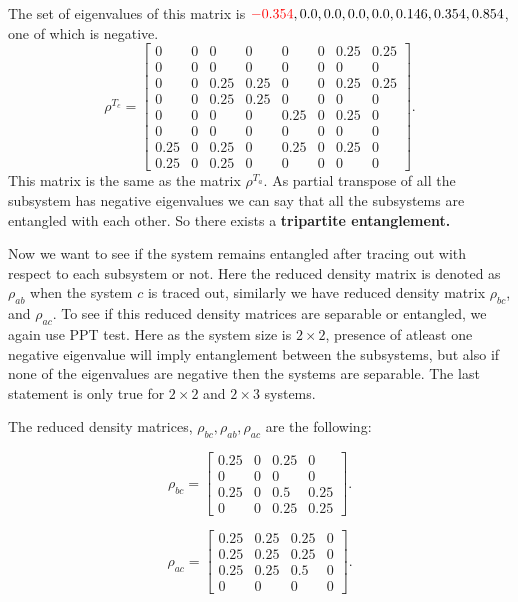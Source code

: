 \documentclass{amsart}
\theoremstyle{plain}
\theoremstyle{definition}
\theoremstyle{plain}
\begin{document}
 	The set of eigenvalues of this matrix is $\textcolor{red}{-0.354}, 0.0, 0.0, 0.0, 0.0, 0.146, 0.354, 0.854$, one of which is negative. 
 	\begin{equation*}
 		\rho^{T_c} = \left[\begin{matrix}0 & 0 & 0 & 0 & 0 & 0 & 0.25 & 0.25\\0 & 0 & 0 & 0 & 0 & 0 & 0 & 0\\0 & 0 & 0.25 & 0.25 & 0 & 0 & 0.25 & 0.25\\0 & 0 & 0.25 & 0.25 & 0 & 0 & 0 & 0\\0 & 0 & 0 & 0 & 0.25 & 0 & 0.25 & 0\\0 & 0 & 0 & 0 & 0 & 0 & 0 & 0\\0.25 & 0 & 0.25 & 0 & 0.25 & 0 & 0.25 & 0\\0.25 & 0 & 0.25 & 0 & 0 & 0 & 0 & 0\end{matrix}\right].
 	\end{equation*}
	This matrix is the same as the matrix $\rho^{T_a}$. As partial transpose of all the subsystem has negative eigenvalues we can say that all the subsystems are entangled with each other. So there exists a \textbf{tripartite entanglement.}
	
	Now we want to see if the system remains entangled after tracing out with respect to each subsystem or not. Here the reduced density matrix is denoted as $\rho_{ab}$ when the system $c$ is traced out, similarly we have reduced density matrix $\rho_{bc}$, and $\rho_{ac}$. To see if this reduced density matrices are separable or entangled, we again use PPT test. Here as the system size is $2 \times 2$, presence of atleast one negative eigenvalue will imply entanglement between the subsystems, but also if none of the eigenvalues are negative then the systems are separable. The last statement is only true for $2 \times 2$ and $2 \times 3$ systems.
	
	The reduced density matrices, $ \rho_{bc},\rho_{ab}, \rho_{ac}$ are the following:
	
	\begin{equation*}
		\rho_{bc} = \left[\begin{matrix}0.25 & 0 & 0.25 & 0\\0 & 0 & 0 & 0\\0.25 & 0 & 0.5 & 0.25\\0 & 0 & 0.25 & 0.25\end{matrix}\right].
	\end{equation*}

	\begin{equation*}
		\rho_{ac} = \left[\begin{matrix}0.25 & 0.25 & 0.25 & 0\\0.25 & 0.25 & 0.25 & 0\\0.25 & 0.25 & 0.5 & 0\\0 & 0 & 0 & 0\end{matrix}\right].
	\end{equation*}
\end{document}
